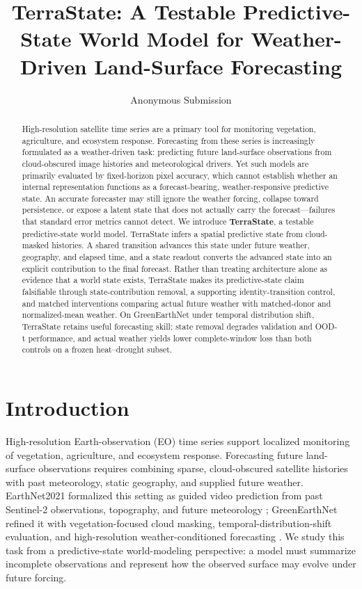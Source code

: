 \documentclass[letterpaper]{article} %
\title{TerraState: A Testable Predictive-State World Model for Weather-Driven Land-Surface Forecasting}
\author{Anonymous Submission}
\begin{document}
\maketitle

\begin{abstract}
High-resolution satellite time series are a primary tool for monitoring
vegetation, agriculture, and ecosystem response. Forecasting from these
series is increasingly formulated as a weather-driven task: predicting
future land-surface observations from cloud-obscured image histories and
meteorological drivers. Yet such models are primarily evaluated by
fixed-horizon pixel accuracy, which cannot establish whether an internal
representation functions as a forecast-bearing, weather-responsive
predictive state. An accurate forecaster may still ignore the weather
forcing, collapse toward persistence, or expose a latent state that does
not actually carry the forecast---failures that standard error metrics
cannot detect. We introduce \textbf{TerraState}, a testable
predictive-state world model. TerraState infers a spatial predictive state
from cloud-masked histories. A shared transition advances this state under
future weather, geography, and elapsed time, and a state readout converts
the advanced state into an explicit contribution to the final forecast.
Rather than treating architecture alone as evidence that a world state
exists, TerraState makes its predictive-state claim falsifiable through
state-contribution removal, a supporting identity-transition control, and
matched interventions comparing actual future weather with matched-donor
and normalized-mean weather. On GreenEarthNet under temporal distribution
shift, TerraState retains useful forecasting skill; state removal degrades
validation and OOD-t performance, and actual weather yields lower
complete-window loss than both controls on a frozen heat--drought subset.
\end{abstract}

\section{Introduction}

High-resolution Earth-observation (EO) time series support localized
monitoring of vegetation, agriculture, and ecosystem response. Forecasting
future land-surface observations requires combining sparse, cloud-obscured
satellite histories with past meteorology, static geography, and supplied
future weather. EarthNet2021 formalized this setting as guided video prediction
from past Sentinel-2 observations, topography, and future meteorology
\cite{requenamesa2021earthnet}; GreenEarthNet refined it with
vegetation-focused cloud masking, temporal-distribution-shift evaluation, and
high-resolution weather-conditioned forecasting \cite{benson2024multimodal}.
We study this task from a predictive-state world-modeling perspective: a model
must summarize incomplete observations and represent how the observed surface
may evolve under future forcing.
\end{document}
